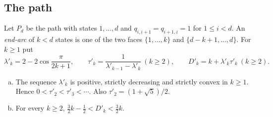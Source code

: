 \subsection{The path}\label{app:paths}

Let $P_d$ be the path with states $1,\dots,d$ and $q_{i,i+1}=q_{i+1,i}=1$ for
$1\le i<d$. An \emph{end-arc} of $k<d$ states is one of the two faces
$\{1,\dots,k\}$ and $\{d-k+1,\dots,d\}$. For $k\ge1$ put
\[
 \lambda'_k=2-2\cos\frac{\pi}{2k+1},\qquad
 \tau'_k=\frac1{\lambda'_{k-1}-\lambda'_k}\ (k\ge2),\qquad
 D'_k=k+\lambda'_k\tau'_k\ (k\ge2).
\]

\begin{lemma}\label{lem:Dprime}
\begin{enumerate}[(a)]
\item The sequence $\lambda'_k$ is positive, strictly decreasing and strictly
convex in $k\ge1$. Hence $0<\tau'_2<\tau'_3<\cdots$. Also
$\tau'_2=(1+\sqrt5)/2$.
\item For every $k\ge2$, $\frac32k-\frac12<D'_k<\frac32k$.
\end{enumerate}
\end{lemma}


